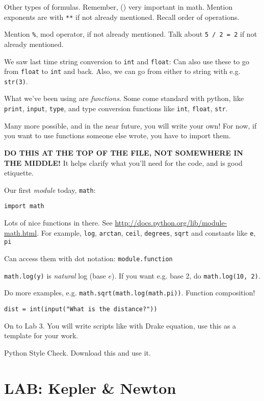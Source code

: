 \documentclass{article}
\begin{document}
Other types of formulas.  Remember, () very important in math.
Mention exponents are with \verb|**| if not already mentioned. Recall
order of operations.

Mention \verb|%|, mod operator, if not already mentioned.
Talk about \verb|5 / 2 = 2| if not already mentioned.

We saw last time string conversion to \verb|int| and \verb|float|: Can
also use these to go from \verb|float| to \verb|int| and back.  Also,
we can go from either to string with e.g. \verb|str(3)|.

What we've been using are \emph{functions}.  Some come standard with
python, like \verb|print|, \verb|input|, \verb|type|, and type
conversion functions like \verb|int|, \verb|float|, \verb|str|.

Many more possible, and in the near future, you will write your own!
For now, if you want to use functions someone else wrote, you have to
import them.

\textbf{DO THIS AT THE TOP OF THE FILE, NOT SOMEWHERE IN THE MIDDLE!}
It helps clarify what you'll need for the code, and is good etiquette.

Our first \emph{module} today, \verb|math|:
\begin{verbatim}
import math
\end{verbatim}

Lots of nice functions in there.  See
\url{http://docs.python.org/lib/module-math.html}.  For example,
\verb|log|, \verb|arctan|, \verb|ceil|, \verb|degrees|, \verb|sqrt|
and constants like \verb|e|, \verb|pi|

Can access them with dot notation: \verb|module.function|

\verb|math.log(y)| is \emph{natural} log (base $e$). If you want
e.g. base 2, do \verb|math.log(10, 2)|.

Do more examples, e.g. \verb|math.sqrt(math.log(math.pi))|.  Function
composition!

\begin{verbatim}
dist = int(input("What is the distance?"))
\end{verbatim}

On to Lab 3.  You will write scripts like with Drake equation, use
this as a template for your work.

Python Style Check.  Download this and use it.

\section{LAB: Kepler \& Newton}
\end{document}

